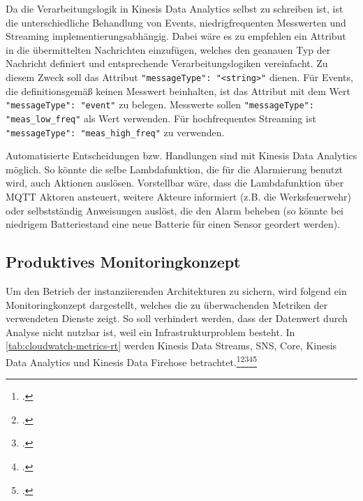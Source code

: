 Da die Verarbeitungslogik in Kinesis Data Analytics selbst zu schreiben ist, ist die unterschiedliche Behandlung von Events, niedrigfrequenten Messwerten und Streaming implementierungsabhängig. Dabei wäre es zu empfehlen ein Attribut in die übermittelten Nachrichten einzufügen, welches den geanauen Typ der Nachricht definiert und entsprechende Verarbeitungslogiken vereinfacht. Zu diesem Zweck soll das Attribut \texttt{{"messageType": "<string>"}} dienen. Für Events, die definitionsgemäß keinen Messwert beinhalten, ist das Attribut mit dem Wert \texttt{{"messageType": "event"}} zu belegen. Messwerte sollen \texttt{{"messageType": "meas_low_freq"}} als Wert verwenden. Für hochfrequentes Streaming ist \texttt{{"messageType": "meas_high_freq"}} zu verwenden.

Automatisierte Entscheidungen bzw. Handlungen sind mit Kinesis Data Analytics möglich. So könnte die selbe Lambdafunktion, die für die Alarmierung benutzt wird, auch Aktionen auslösen. Vorstellbar wäre, dass die Lambdafunktion über \ac{MQTT} Aktoren ansteuert, weitere Akteure informiert (z.B. die Werksfeuerwehr) oder selbstständig Anweisungen auslöst, die den Alarm beheben (so könnte bei niedrigem Batteriestand eine neue Batterie für einen Sensor geordert werden). 


\subsection{Produktives Monitoringkonzept} \label{chap:echtzeit_ops}
Um den Betrieb der instanziierenden Architekturen zu sichern, wird folgend ein Monitoringkonzept dargestellt, welches die zu überwachenden Metriken der verwendeten Dienste zeigt. So soll verhindert werden, dass der Datenwert durch Analyse nicht nutzbar ist, weil ein Infrastrukturproblem besteht.
In \autoref{tab:cloudwatch-metrics-rt} werden Kinesis Data Streams, \ac{SNS}, \AWSIOT{} Core, Kinesis Data Analytics und Kinesis Data Firehose betrachtet.\footcite[Vgl.][]{AmazonWebServicesInc..o.J.bb}\nzitat\footcite[Vgl.][]{AmazonWebServicesInc..o.J.bc}\nzitat\footcite[Vgl.][]{AmazonWebServicesInc..o.J.az}\nzitat\footcite[Vgl.][]{AmazonWebServicesInc..o.J.ay}\nzitat\footcite[Vgl.][]{AmazonWebServicesInc..o.J.bj}


